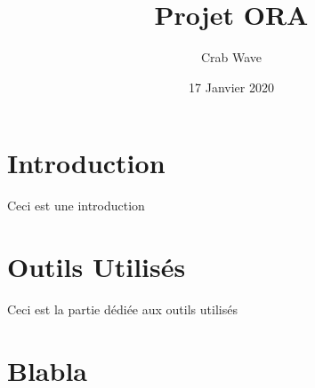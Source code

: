 \documentclass[11pt, a4paper]{specifications}
\title{Projet ORA}
\author{Crab Wave}
\date{17 Janvier 2020}
\begin{document}
	\maketitle
	\thispagestyle{empty}   %
	\clearpage

	\tableofcontents
	\clearpage

	\section{Introduction}
	Ceci est une introduction
	\section{Outils Utilisés}
	Ceci est la partie dédiée aux outils utilisés
	\clearpage
	\section{Blabla}
	\lipsum
\end{document}
